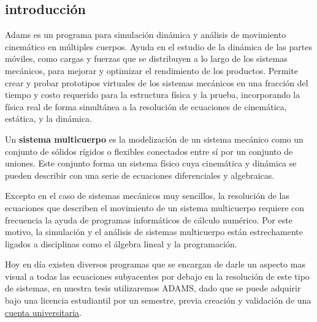      \subsection{introducción}

    Adams es un programa para simulación dinámica y análisis de movimiento cinemático en múltiples cuerpos. Ayuda en el estudio de la dinámica de las partes móviles, como cargas y fuerzas que se distribuyen a lo largo de los sistemas mecánicos, para mejorar y optimizar el rendimiento de los productos. Permite  crear y probar prototipos virtuales de los sistemas mecánicos en una fracción del tiempo y costo requerido para la estructura física y la prueba, incorporando la física real de forma simultánea a la resolución de ecuaciones de cinemática, estática, y la dinámica.

    
    



    
    Un \textbf{sistema multicuerpo} es la modelización de un sistema mecánico como un conjunto de sólidos rígidos o flexibles conectados entre sí por un conjunto de uniones. Este conjunto forma un sistema físico cuya cinemática y dinámica se pueden describir con una serie de ecuaciones diferenciales y algebraicas.\cite{cap3:adams-dinamica_multicuerpo}
    
    Excepto en el caso de sistemas mecánicos muy sencillos, la resolución de las ecuaciones que describen el movimiento de un sistema multicuerpo requiere con frecuencia la ayuda de programas informáticos de cálculo numérico. Por este motivo, la simulación y el análisis de sistemas multicuerpo están estrechamente ligados a disciplinas como el álgebra lineal y la programación.
    
    Hoy en día existen diversos programas que se encargan de darle un aspecto mas visual a todas las ecuaciones subyacentes por debajo en la resolución de este tipo de sistemas, en nuestra tesis utilizaremos ADAMS, dado que se puede adquirir bajo una licencia estudiantil por un semestre, previa creación y validación de una \href{https://www.mscsoftware.com/page/adams-student-edition}{cuenta universitaria}.
    
